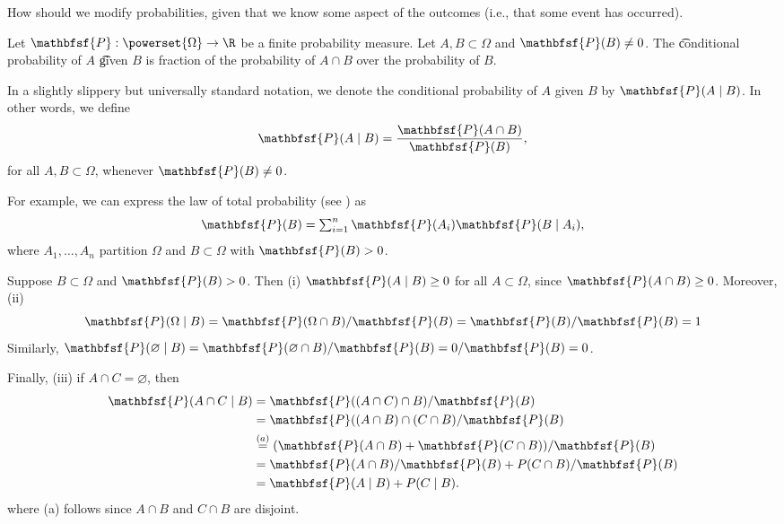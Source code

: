 

How should we modify probabilities, given that we know some aspect of the outcomes (i.e., that some event has occurred).

Let $\mathbfsf{P} : \powerset{\Omega } \to \R $ be a finite probability measure.
Let $A, B \subset \Omega $ and $\mathbfsf{P} (B) \neq 0$.
The \t{conditional probability} of $A$ \t{given} $B$ is fraction of the probability of $A \cap B$ over the probability of $B$.

In a slightly slippery but universally standard notation, we denote the conditional probability of $A$ given $B$ by $\mathbfsf{P} (A \mid B)$.
In other words, we define
  \[
\mathbfsf{P} (A \mid B) = \frac{\mathbfsf{P} (A \cap B)}{\mathbfsf{P} (B)},
  \]
for all $A, B \subset \Omega $, whenever $\mathbfsf{P} (B) \neq 0$.

For example, we can express the law of total probability (see ) as
  \[
\textstyle
\mathbfsf{P} (B) = \sum_{i = 1}^{n} \mathbfsf{P} (A_i)\mathbfsf{P} (B \mid A_i),
  \]
where $A_1, \dots, A_n$ partition $\Omega $ and $B \subset \Omega $ with $\mathbfsf{P} (B) > 0$.

Suppose $B \subset \Omega $ and $\mathbfsf{P} (B) > 0$.
Then (i) $\mathbfsf{P} (A \mid B) \geq 0$ for all $A \subset \Omega $, since $\mathbfsf{P} (A \cap B) \geq 0$.
Moreover, (ii)
  \[
\mathbfsf{P} (\Omega  \mid B) = \mathbfsf{P} (\Omega  \cap B)/\mathbfsf{P} (B) = \mathbfsf{P} (B)/\mathbfsf{P} (B) = 1
  \]
Similarly, $\mathbfsf{P} (\varnothing \mid B) = \mathbfsf{P} (\varnothing \cap B)/\mathbfsf{P} (B) = 0/\mathbfsf{P} (B) = 0$.

Finally, (iii) if $A \cap C = \varnothing$, then
  \[
\begin{aligned}
\mathbfsf{P} (A \cap C \mid B)
&=
\mathbfsf{P} ((A \cap C) \cap B)/\mathbfsf{P} (B) \\
&=
\mathbfsf{P} ((A \cap B) \cap (C \cap B)/\mathbfsf{P} (B) \\
&\overset{(a)}{=}
(\mathbfsf{P} (A \cap B) + \mathbfsf{P} (C \cap B))/\mathbfsf{P} (B) \\
&=
\mathbfsf{P} (A \cap B)/\mathbfsf{P} (B) + P(C \cap B)/\mathbfsf{P} (B) \\
&=
\mathbfsf{P} (A \mid B) + P(C \mid B).
\end{aligned}
  \]
where (a) follows since $A \cap B$ and $C \cap B$ are disjoint.


